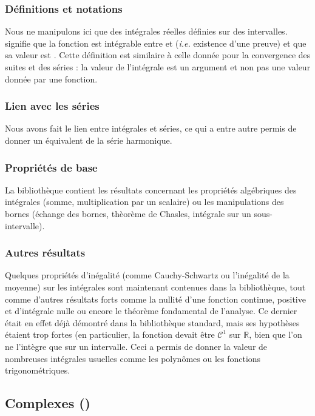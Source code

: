 \subsubsection{Définitions et notations}
	Nous ne manipulons ici que des intégrales réelles définies sur des intervalles.  signifie que la fonction  est intégrable entre  et  (\emph{i.e.} existence d'une preuve) et que sa valeur est . Cette définition est similaire à celle donnée pour la convergence des suites et des séries : la valeur de l'intégrale est un argument et non pas une valeur donnée par une fonction.
	
	\subsubsection{Lien avec les séries}
		Nous avons fait le lien entre intégrales et séries, ce qui a entre autre permis de donner un équivalent de la série harmonique.
	
\subsubsection{Propriétés de base}
	La bibliothèque contient les résultats concernant les propriétés algébriques des intégrales (somme, multiplication par un scalaire) ou les manipulations des bornes (échange des bornes, thèorème de Chasles, intégrale sur un sous-intervalle).
	
	\subsubsection{Autres résultats}
	Quelques propriétés d'inégalité (comme Cauchy-Schwartz ou l'inégalité de la moyenne) sur les intégrales sont maintenant contenues dans la bibliothèque, tout comme d'autres résultats forts comme la nullité d'une fonction continue, positive et d'intégrale nulle ou encore le théorème fondamental de l'analyse. 
	Ce dernier était en effet déjà démontré dans la bibliothèque standard, mais ses hypothèses étaient trop fortes (en particulier, la fonction devait être $\mathcal{C}^1$ sur $\mathbb{R}$, bien que l'on ne l'intègre que sur un intervalle. Ceci a permis de donner la valeur de nombreuses intégrales usuelles comme les polynômes ou les fonctions trigonométriques.
	
\subsection{Complexes ()}


